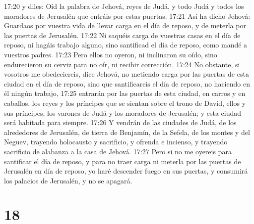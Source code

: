 17:20 y diles: Oíd la palabra de Jehová, reyes de Judá, y todo Judá y todos los moradores de Jerusalén que entráis por estas puertas.  
17:21 Así ha dicho Jehová: Guardaos por vuestra vida de llevar carga en el día de reposo, y de meterla por las puertas de Jerusalén. 
17:22 Ni saquéis carga de vuestras casas en el día de reposo, ni hagáis trabajo alguno, sino santificad el día de reposo, como mandé a vuestros padres. 
17:23 Pero ellos no oyeron, ni inclinaron su oído, sino endurecieron su cerviz para no oír, ni recibir corrección.  
17:24 No obstante, si vosotros me obedeciereis, dice Jehová, no metiendo carga por las puertas de esta ciudad en el día de reposo, sino que santificareis el día de reposo, no haciendo en él ningún trabajo,  
17:25 entrarán por las puertas de esta ciudad, en carros y en caballos, los reyes y los príncipes que se sientan sobre el trono de David, ellos y sus príncipes, los varones de Judá y los moradores de Jerusalén; y esta ciudad será habitada para siempre.  
17:26 Y vendrán de las ciudades de Judá, de los alrededores de Jerusalén, de tierra de Benjamín, de la Sefela, de los montes y del Neguev, trayendo holocausto y sacrificio, y ofrenda e incienso, y trayendo sacrificio de alabanza a la casa de Jehová.  
17:27 Pero si no me oyereis para santificar el día de reposo, y para no traer carga ni meterla por las puertas de Jerusalén en día de reposo, yo haré descender fuego en sus puertas, y consumirá los palacios de Jerusalén, y no se apagará.  
  

\chapter{18}

